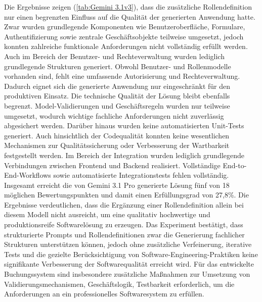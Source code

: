 \newpage
Die Ergebnisse zeigen (\ref{tab:Gemini 3.1v3}), dass die zusätzliche Rollendefinition nur einen begrenzten Einfluss auf die Qualität der generierten Anwendung hatte. Zwar wurden grundlegende Komponenten wie Benutzeroberfläche, Formulare, Authentifizierung sowie zentrale Geschäftsobjekte teilweise umgesetzt, jedoch konnten zahlreiche funktionale Anforderungen nicht vollständig erfüllt werden.
Auch im Bereich der Benutzer- und Rechteverwaltung wurden lediglich grundlegende Strukturen generiert. Obwohl Benutzer- und Rollenmodelle vorhanden sind, fehlt eine umfassende Autorisierung und Rechteverwaltung. Dadurch eignet sich die generierte Anwendung nur eingeschränkt für den produktiven Einsatz.
Die technische Qualität der Lösung bleibt ebenfalls begrenzt. Model-Validierungen und Geschäftsregeln wurden nur teilweise umgesetzt, wodurch wichtige fachliche Anforderungen nicht zuverlässig abgesichert werden. Darüber hinaus wurden keine automatisierten Unit-Tests generiert. Auch hinsichtlich der Codequalität konnten keine wesentlichen Mechanismen zur Qualitätssicherung oder Verbesserung der Wartbarkeit festgestellt werden.
Im Bereich der Integration wurden lediglich grundlegende Verbindungen zwischen Frontend und Backend realisiert. Vollständige End-to-End-Workflows sowie automatisierte Integrationstests fehlen vollständig. 
Insgesamt erreicht die von Gemini 3.1 Pro generierte Lösung fünf von 18 möglichen Bewertungspunkten und damit einen Erfüllungsgrad von 27,8\%. Die Ergebnisse verdeutlichen, dass die Ergänzung einer Rollendefinition allein bei diesem Modell nicht ausreicht, um eine qualitativ hochwertige und produktionsreife Softwarelösung zu erzeugen. Das Experiment bestätigt, dass strukturierte Prompts und Rollendefinitionen zwar die Generierung fachlicher Strukturen unterstützen können, jedoch ohne zusätzliche Verfeinerung, iterative Tests und die gezielte Berücksichtigung von Software-Engineering-Praktiken keine signifikante Verbesserung der Softwarequalität erreicht wird. Für das entwickelte Buchungssystem sind insbesondere zusätzliche Maßnahmen zur Umsetzung von Validierungsmechanismen, Geschäftslogik, Testbarkeit erforderlich, um die Anforderungen an ein professionelles Softwaresystem zu erfüllen.